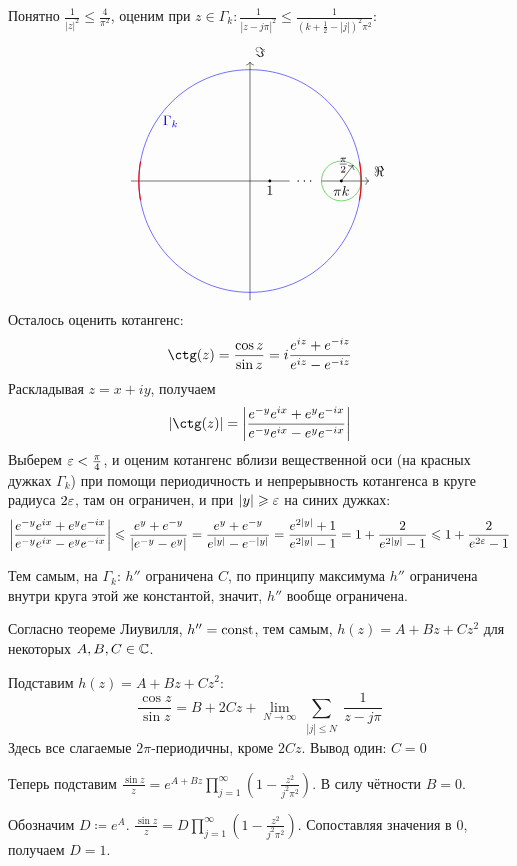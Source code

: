 \documentclass[a4paper]{report}
\begin{document}
{{{            Понятно $\frac{1}{|z|^2} \le \frac{4}{\pi^2}$, оценим при $z \in \Gamma_k: \frac{1}{|z - j\pi|^2} \le \frac{1}{(k + \frac{1}{2} - |j|)^2\pi^2}$:
            \[\begin{tikzpicture}
                  \draw[] (-3, 0) -- (1, 0);
                  \draw[->] (1.8, 0) -- (3, 0) node[above right] {$\Re$};
                  \draw[->] (0, -3) -- (0, 3) node[above right] {$\Im$};
                  \fill (0.5, 0) circle (1pt) node[below] {$1$};
                  \node at (1.4, 0) {$\dots$};
                  \fill (2.3, 0) circle (1pt) node[below] {$\pi k$};
                  \draw[blue] (0, 0) circle (2.8);
                  \draw[darkgreen] (2.3, 0) circle (0.5);
                  \draw[->] (2.3, 0) -- (2.6, 0.4) node[left] {$\frac{\pi}{2}$};
                  \node[blue] at (-2.5 * 0.8, 2.5 * 0.6) {$\Gamma_k$};
                  \draw[red,thick,smooth,domain=-10:10] plot ({2.8*cos(\x)}, {2.8 * sin(\x)});
                  \draw[red,thick,smooth,domain=170:190] plot ({2.8*cos(\x)}, {2.8 * sin(\x)});
            \end{tikzpicture}\]
            Осталось оценить котангенс:
            \[\ctg(z) = \frac{\cos z}{\sin z} = i \frac{e^{iz} + e^{-iz}}{e^{iz} - e^{-iz}}\]
        Раскладывая $z = x + iy$, получаем
            \[|\ctg(z)| = \abs{\frac{e^{-y}e^{ix} + e^y e^{-ix}}{e^{-y}e^{ix} - e^y e^{-ix}}}\]
            Выберем $\varepsilon < \frac{\pi}{4}$, и оценим котангенс вблизи вещественной оси (на красных дужках $\Gamma_k$) при помощи периодичность и непрерывность котангенса в круге радиуса $2\varepsilon$, там он ограничен, и при $|y| \geqslant \varepsilon$ на синих дужках:
            \[\left|\frac{e^{-y}e^{ix} + e^y e^{-ix}}{e^{-y}e^{ix} - e^y e^{-ix}}\right| \leqslant \frac{e^y + e^{-y}}{|e^{-y} - e^y|} = \frac{e^y + e^{-y}}{e^{|y|} - e^{-|y|}} = \frac{e^{2|y|} + 1}{e^{2|y|} - 1} = 1 + \frac{2}{e^{2|y|} - 1} \leqslant 1 + \frac{2}{e^{2\varepsilon} - 1}\]
        \item Тем самым, на $\Gamma_k$: $h''$ ограничена $C$, по принципу максимума $h''$ ограничена внутри круга этой же константой, значит, $h''$ вообще ограничена.

            Согласно теореме Лиувилля, $h'' = \operatorname{const}$, тем самым, $h(z) = A + Bz + C z^2$ для некоторых $A,B,C \in \mathbb{C}$.
        \item Подставим $h(z) =  A + Bz + C z^2$:
        \[\frac{\cos z}{\sin z} = B + 2Cz + \lim\limits_{N \to \infty}\sum\limits_{\substack{|j| \le N}}\frac{1}{z - j\pi}\]
        Здесь все слагаемые $2\pi$-периодичны, кроме $2 C z$. Вывод один: $C = 0$
        \item Теперь подставим $\frac{\sin z}{z} = e^{A + Bz}\prod\limits_{j = 1}^{\infty}\left(1 - \frac{z^2}{j^2\pi^2}\right)$.
            В силу чётности $B = 0$.
        \item   Обозначим $D \coloneqq e^A$. $\frac{\sin z}{z} = D\prod\limits_{j = 1}^{\infty}\left(1 - \frac{z^2}{j^2\pi^2}\right)$.
        Сопоставляя значения в $0$, получаем $D = 1$.\qedhere
        }
    }
    }
\end{document}
